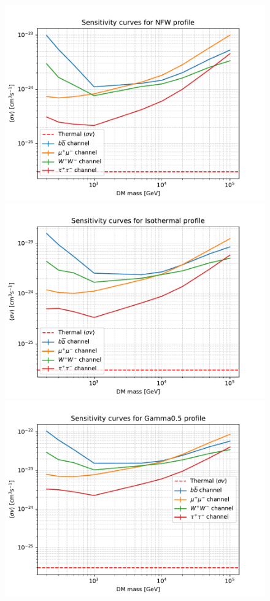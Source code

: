\documentclass{article}
\begin{document}
\begin{figure}
\centering
{}
\includegraphics[width=1\textwidth]{Pictures/Limits_NFW.pdf}
\endminipage 
{}
\includegraphics[width=1\textwidth]{Pictures/Limits_Isothermal.pdf}
\endminipage \\
\includegraphics[width=1\textwidth]{Pictures/Limits_Gamma0-5.pdf}

\end{figure}
\end{document}
